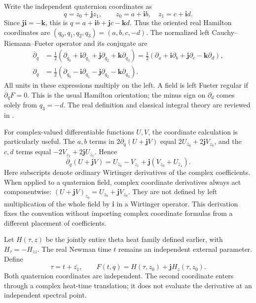 \documentclass[11pt]{article}
\numberwithin{equation}{section}
\theoremstyle{definition}
\theoremstyle{remark}
\begin{document}
Write the independent quaternion coordinates as
\begin{equation}
 q=z_0+\mathbf jz_1,
 \qquad z_0=a+\mathbf ib,
 \quad z_1=c+\mathbf id.
 \label{eq:q21-coordinates}
\end{equation}
Since \(\mathbf j\mathbf i=-\mathbf k\), this is
\(q=a+\mathbf ib+\mathbf jc-\mathbf kd\).
Thus the oriented real Hamilton coordinates are
\((q_0,q_1,q_2,q_3)=(a,b,c,-d)\).
The normalized left Cauchy--Riemann--Fueter operator and its conjugate
are
\begin{align}
 \overline\partial_q
 &=\tfrac12(\partial_{q_0}+\mathbf i\partial_{q_1}
       +\mathbf j\partial_{q_2}+\mathbf k\partial_{q_3})
 =\tfrac12(\partial_a+\mathbf i\partial_b
       +\mathbf j\partial_c-\mathbf k\partial_d),
 \label{eq:q21-fueter-operator}\\
 \partial_q
 &=\tfrac12(\partial_{q_0}-\mathbf i\partial_{q_1}
       -\mathbf j\partial_{q_2}-\mathbf k\partial_{q_3}).
 \label{eq:q21-conjugate-operator}
\end{align}
All units in these expressions multiply on the left. A field is
left Fueter regular if \(\overline\partial_qF=0\).
This is the usual Hamilton orientation; the minus sign on
\(\partial_d\) comes solely from \(q_3=-d\).
The real definition and classical integral theory are reviewed in
\cite{sudbery,frenkellibine}.

For complex-valued differentiable functions \(U,V\), the coordinate
calculation is particularly useful. The \(a,b\) terms in
\(2\overline\partial_q(U+\mathbf jV)\) equal
\(2U_{\bar z_0}+2\mathbf jV_{z_0}\), and the \(c,d\) terms equal
\(-2V_{z_1}+2\mathbf jU_{\bar z_1}\). Hence
\begin{equation}
 \overline\partial_q(U+\mathbf jV)
 =U_{\bar z_0}-V_{z_1}
       +\mathbf j(V_{z_0}+U_{\bar z_1}).
 \label{eq:q21-component-fueter}
\end{equation}
Here subscripts denote ordinary Wirtinger derivatives of the complex
coefficients. When applied to a quaternion field, complex coordinate
derivatives always act componentwise:
\((U+\mathbf jV)_{z_0}=U_{z_0}+\mathbf jV_{z_0}\).
They are not defined by left multiplication of the whole field by
\(\mathbf i\) in a Wirtinger operator. This derivation fixes the
convention without importing complex coordinate formulas from a
different placement of coefficients.

Let \(H(\tau,z)\) be the jointly entire theta heat family defined
earlier, with
\(H_\tau=-H_{zz}\). The real Newman time \(t\) remains an independent
external parameter. Define
\begin{equation}
 \tau=t+\overline{z_1},\qquad
 F(t,q)=H(\tau,z_0)+\mathbf jH_z(\tau,z_0).
 \label{eq:q21-adopted-lift}
\end{equation}
Both quaternion coordinates are independent. The second coordinate
enters through a complex heat-time translation; it does not evaluate
the derivative at an independent spectral point.
\end{document}
